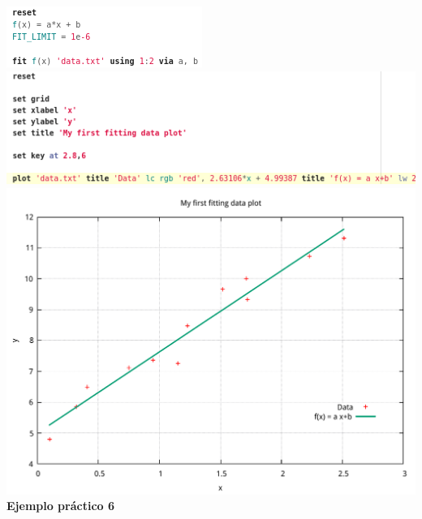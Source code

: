 \documentclass[11.5pt,a4paper]{article}
\begin{document}
\includegraphics[scale=0.50]{screen8.png}\\
\includegraphics[scale=0.50]{screen9.png}
\includegraphics[scale=0.40]{ejemplo8.pdf}\\

\textbf{Ejemplo práctico 6}\\
\end{document}
